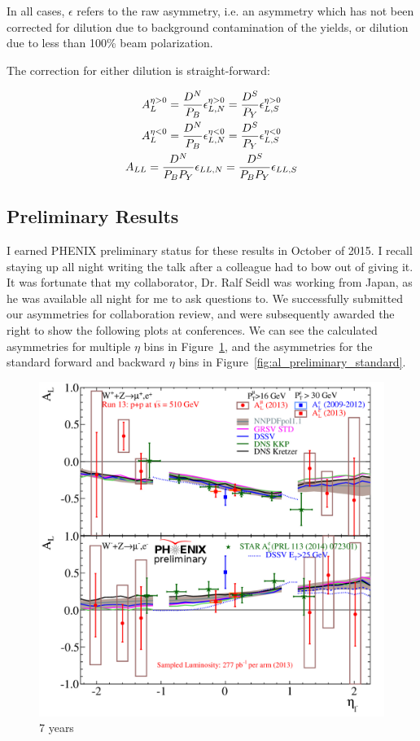 In all cases, $\epsilon$ refers to the raw asymmetry, i.e. an asymmetry which
has not been corrected for dilution due to background contamination of the
yields, or dilution due to less than 100\% beam polarization.

{\noindent}The correction for either dilution is straight-forward:

\begin{gather}
  {A_L^{\eta>0}} = {{D^N}\over{P_B}}{\epsilon_{L,N}^{\eta>0}} = {{D^S}\over{P_Y}}{\epsilon_{L,S}^{\eta>0}} \\
  {A_L^{\eta<0}} = {{D^N}\over{P_B}}{\epsilon_{L,N}^{\eta<0}} = {{D^S}\over{P_Y}}{\epsilon_{L,S}^{\eta<0}} \\
  {A_{LL}}       = {{D^N}\over{P_BP_Y}}{\epsilon_{LL,N}}      = {{D^S}\over{P_BP_Y}}{\epsilon_{LL,S}}       
  \label{eq:dilution_correction}
\end{gather}

\subsection{Preliminary Results}

I earned PHENIX preliminary status for these results in October of 2015. I
recall staying up all night writing the talk after a colleague had to bow out of
giving it. It was fortunate that my collaborator, Dr. Ralf Seidl was working
from Japan, as he was available all night for me to ask questions to. We
successfully submitted our asymmetries for collaboration review, and were
subsequently awarded the right to show the following plots at conferences. We
can see the calculated asymmetries for multiple $\eta$ bins in
Figure~\ref{fig:al_preliminary_three_eta}, and the asymmetries for the standard
forward and backward $\eta$ bins in Figure~\ref{fig:al_preliminary_standard}.

\begin{figure}[ht]
  \centering
  \includegraphics[width=0.8\linewidth]{./figures/prelim_AL_6bins.jpg}
  \caption{
    7 years
  }
  \label{fig:al_preliminary_three_eta}
\end{figure}


